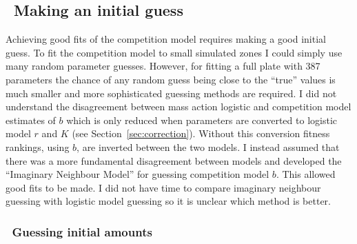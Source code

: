 
\subsection{\thesubsection~Making an initial guess}
\label{sec:initial_guess}

Achieving good fits of the competition model requires making a good
initial guess. To fit the competition model to small simulated zones I
could simply use many random parameter guesses. However, for fitting a
full plate with 387 parameters the chance of any random guess being
close to the ``true'' values is much smaller and more sophisticated
guessing methods are required. I did not understand the disagreement
between mass action logistic and competition model estimates of \(b\)
which is only reduced when parameters are converted to logistic model
\(r\) and \(K\) (see Section~\ref{sec:correction}). Without this
conversion fitness rankings, using \(b\), are inverted between the two
models. I instead assumed that there was a more fundamental
disagreement between models and developed the ``Imaginary Neighbour
Model'' for guessing competition model \(b\). This allowed good fits
to be made. I did not have time to compare imaginary neighbour
guessing with logistic model guessing so it is unclear which method is
better.

\subsubsection{\thesubsubsection~Guessing initial amounts}


